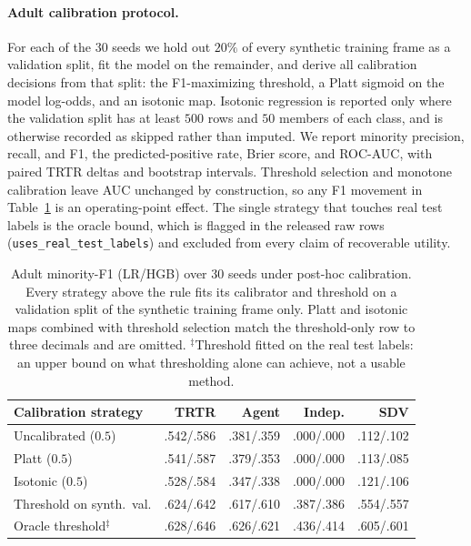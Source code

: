 
\paragraph{Adult calibration protocol.} For each of the 30 seeds we hold out
$20\%$ of every synthetic training frame as a validation split, fit the model on
the remainder, and derive all calibration decisions from that split: the
F1-maximizing threshold, a Platt sigmoid on the model log-odds, and an isotonic
map. Isotonic regression is reported only where the validation split has at least
$500$ rows and $50$ members of each class, and is otherwise recorded as skipped
rather than imputed. We report minority precision, recall, and F1, the
predicted-positive rate, Brier score, and ROC-AUC, with paired TRTR deltas and
bootstrap intervals. Threshold selection and monotone calibration leave AUC
unchanged by construction, so any F1 movement in Table~\ref{tab:calibration} is
an operating-point effect. The single strategy that touches real test labels is
the oracle bound, which is flagged in the released raw rows
(\texttt{uses\_real\_test\_labels}) and excluded from every claim of recoverable
utility.

\begin{table}[t]
\centering
\scriptsize
\setlength{\tabcolsep}{3pt}
\begin{tabular}{lrrrr}
\toprule
Calibration strategy & TRTR & Agent & Indep. & SDV \\
\midrule
Uncalibrated ($0.5$)       & .542/.586 & .381/.359 & .000/.000 & .112/.102 \\
Platt ($0.5$)              & .541/.587 & .379/.353 & .000/.000 & .113/.085 \\
Isotonic ($0.5$)           & .528/.584 & .347/.338 & .000/.000 & .121/.106 \\
Threshold on synth.\ val.  & .624/.642 & .617/.610 & .387/.386 & .554/.557 \\
\midrule
Oracle threshold$^\ddagger$ & .628/.646 & .626/.621 & .436/.414 & .605/.601 \\
\bottomrule
\end{tabular}
\caption{Adult minority-F1 (LR/HGB) over 30 seeds under post-hoc calibration.
Every strategy above the rule fits its calibrator and threshold on a validation
split of the synthetic training frame only. Platt and isotonic maps combined with
threshold selection match the threshold-only row to three decimals and are
omitted. $^\ddagger$Threshold fitted on the real test labels: an upper bound on
what thresholding alone can achieve, not a usable method.}
\label{tab:calibration}
\end{table}


